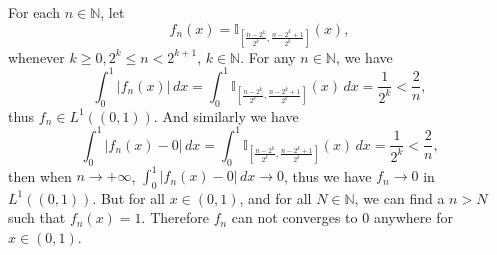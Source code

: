 \documentclass[12pt,a4paper]{ctexart}
\begin{document}
For each $n \in \mathbb N$, let
\begin{equation*}
    f_{n} (x) = \mathbb{I}_{[\frac{n - 2^{k}}{2^{k}}, \frac{n - 2^{k} + 1}{2^{k}}]} (x),
\end{equation*}
whenever $k \geq 0, 2^{k} \leq n < 2^{k + 1}$, $k \in \mathbb N$. For any $n \in \mathbb{N}$, we have
\begin{equation*}
    \int_{0}^{1} | f_{n} (x) | \, d x = \int_{0}^{1} \mathbb{I}_{[\frac{n - 2^{k}}{2^{k}}, \frac{n - 2^{k} + 1}{2^{k}}]} (x) \, d x  = \frac{1}{2^{k}} < \frac{2}{n},
\end{equation*}
thus $f_{n} \in L^{1}((0, 1))$. And similarly we have
\begin{equation*}
    \int_{0}^{1} | f_{n} (x) - 0 | \, d x = \int_{0}^{1} \mathbb{I}_{[\frac{n - 2^{k}}{2^{k}}, \frac{n - 2^{k} + 1}{2^{k}}]} (x) \, d x  = \frac{1}{2^{k}} < \frac{2}{n},
\end{equation*}
then when $n \to + \infty$, $\int_{0}^{1} | f_{n} (x) - 0 | \, d x \to 0$, thus we have $f_{n} \to 0$ in $L^{1}((0, 1))$. But for all $x \in (0, 1)$, and for all $N \in \mathbb{N}$, we can find a $n > N$ such that $f_{n} (x) = 1$. Therefore $f_{n}$ can not converges to $0$ anywhere for $x \in (0, 1)$.
\end{document}
